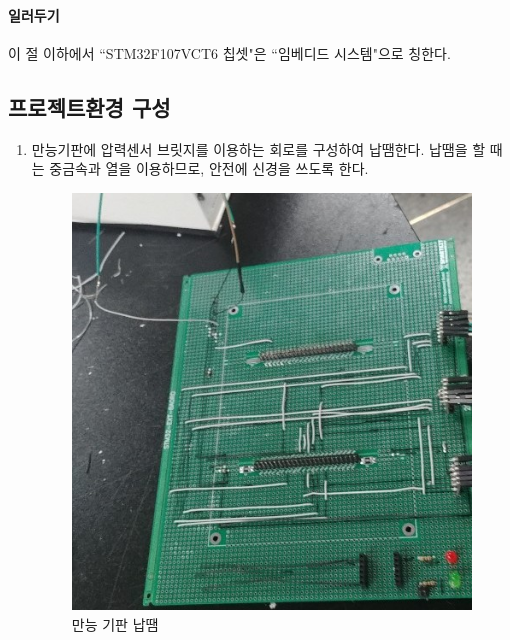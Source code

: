 \documentclass[a4paper,11pt]{article}
\begin{document}
\begin{spacing}{1.6}
\begin{itemize}
 \end{itemize}
 \paragraph{일러두기} 이 절 이하에서 ``STM32F107VCT6 칩셋"은 ``임베디드 시스템"으로 칭한다.
\subsection{프로젝트환경 구성}
\begin{enumerate}
\item 만능기판에 압력센서 브릿지를 이용하는 회로를 구성하여 납땜한다. 납땜을 할 때는 중금속과 열을 이용하므로, 안전에 신경을 쓰도록 한다.

\begin{figure}[hbt!]
\centering
\includegraphics[scale=0.5]{1.jpg}
\caption{만능 기판 납땜}
\label{Fig:Fig04}
\end{figure}


\end{enumerate}
\end{spacing}
\end{document}
